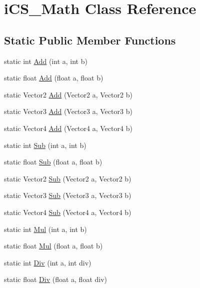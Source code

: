 \hypertarget{classi_c_s___math}{\section{i\+C\+S\+\_\+\+Math Class Reference}
\label{classi_c_s___math}
}
\subsection*{Static Public Member Functions}
\begin{DoxyCompactItemize}
\item 
static int \hyperlink{classi_c_s___math_a3727941e926721f2f5bc90b276d9d7e4}{Add} (int a, int b)
\item 
static float \hyperlink{classi_c_s___math_a861fdf645bec625faf7962b047a9f887}{Add} (float a, float b)
\item 
static Vector2 \hyperlink{classi_c_s___math_aa33dd63e532cbb7243d52c45201028ce}{Add} (Vector2 a, Vector2 b)
\item 
static Vector3 \hyperlink{classi_c_s___math_ade16afbbbebb15d04692e2dc4ac5fb7b}{Add} (Vector3 a, Vector3 b)
\item 
static Vector4 \hyperlink{classi_c_s___math_a821fb856167a60096f2eb926ec277255}{Add} (Vector4 a, Vector4 b)
\item 
static int \hyperlink{classi_c_s___math_aa3c78113fb9b4e39e95e33ec9c3b38e4}{Sub} (int a, int b)
\item 
static float \hyperlink{classi_c_s___math_a508732d2de71a8f76a52418d5a964afb}{Sub} (float a, float b)
\item 
static Vector2 \hyperlink{classi_c_s___math_a333934e0934bd861eb1b4bbbef70c3d7}{Sub} (Vector2 a, Vector2 b)
\item 
static Vector3 \hyperlink{classi_c_s___math_ab0ee88b34ea58be0bfd59f1b5387b883}{Sub} (Vector3 a, Vector3 b)
\item 
static Vector4 \hyperlink{classi_c_s___math_a08bd5db05b7117f055a66119e99146d6}{Sub} (Vector4 a, Vector4 b)
\item 
static int \hyperlink{classi_c_s___math_a044054b6f57e4aff12cc51b1e0ece1d3}{Mul} (int a, int b)
\item 
static float \hyperlink{classi_c_s___math_a38c560afaf6a2612296256e19e7feba0}{Mul} (float a, float b)
\item 
static int \hyperlink{classi_c_s___math_ad8b47c294617d92f5b1605ccaef9e4f8}{Div} (int a, int div)
\item 
static float \hyperlink{classi_c_s___math_a891917cfbaf44b5a331573ab792f5a5d}{Div} (float a, float div)

\end{DoxyCompactItemize}
